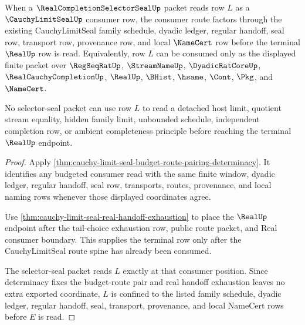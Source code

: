 \begin{theorem}
\label{thm:cauchy-limit-seal-selector-seal-consumer-route}
When a $\RealCompletionSelectorSealUp$ packet reads row $L$ as a $\CauchyLimitSealUp$ consumer row, the consumer route factors through the existing CauchyLimitSeal family schedule, dyadic ledger, regular handoff, seal row, transport row, provenance row, and local $\NameCert$ row before the terminal $\RealUp$ row is read. Equivalently, row $L$ can be consumed only as the displayed finite packet over $\RegSeqRatUp$, $\StreamNameUp$, $\DyadicRatCoreUp$, $\RealCauchyCompletionUp$, $\RealUp$, $\BHist$, $\hsame$, $\Cont$, $\Pkg$, and $\NameCert$.

No selector-seal packet can use row $L$ to read a detached host limit, quotient stream equality, hidden family limit, unbounded schedule, independent completion row, or ambient completeness principle before reaching the terminal $\RealUp$ endpoint.
\end{theorem}
\begin{proof}
Apply \autoref{thm:cauchy-limit-seal-budget-route-pairing-determinacy}. It identifies any budgeted consumer read with the same finite window, dyadic ledger, regular handoff, seal row, transports, routes, provenance, and local naming rows whenever those displayed coordinates agree.

Use \autoref{thm:cauchy-limit-seal-real-handoff-exhaustion} to place the $\RealUp$ endpoint after the tail-choice exhaustion row, public route packet, and Real consumer boundary. This supplies the terminal row only after the CauchyLimitSeal route spine has already been consumed.

The selector-seal packet reads $L$ exactly at that consumer position. Since determinacy fixes the budget-route pair and real handoff exhaustion leaves no extra exported coordinate, $L$ is confined to the listed family schedule, dyadic ledger, regular handoff, seal, transport, provenance, and local NameCert rows before $E$ is read.
\end{proof}

